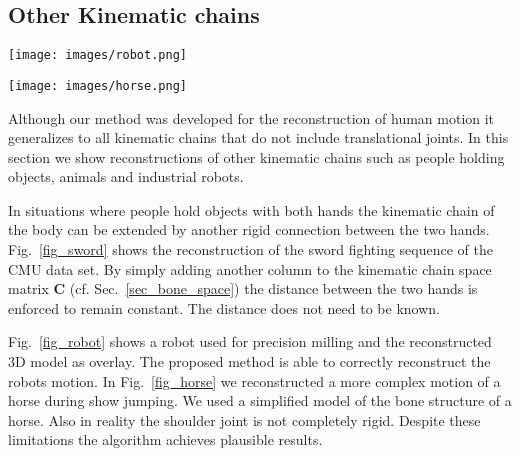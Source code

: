\documentclass[10pt,letterpaper]{article}
\begin{document}
\subsection{Other Kinematic chains}
\label{sec_eval_kin_chains}

\begin{figure*}[t]
	\begin{center}
		\texttt{[image: images/robot.png]}
	\end{center}
	\caption{Reconstruction of a sequence of an industrial robot moving along a path. The reconstruction is shown as an augmented overlay over the images.}
	\label{fig_robot}
\end{figure*}
\begin{figure*}[t]
	\begin{center}
		\texttt{[image: images/horse.png]}
	\end{center}
	\caption{Reconstruction of a horse riding sequence. Although we use a very rough model for the skeleton of the horse we obtain plausible reconstructions.}
	\label{fig_horse}
\end{figure*}

Although our method was developed for the reconstruction of human motion it generalizes to all kinematic chains that do not include translational joints. In this section we show reconstructions of other kinematic chains such as people holding objects, animals and industrial robots.

In situations where people hold objects with both hands the kinematic chain of the body can be extended by another rigid connection between the two hands. Fig.~\ref{fig_sword} shows the reconstruction of the sword fighting sequence of the CMU data set. By simply adding another column to the kinematic chain space matrix $\bm{C}$ (cf. Sec.~\ref{sec_bone_space}) the distance between the two hands is enforced to remain constant. The distance does not need to be known.

Fig.~\ref{fig_robot} shows a robot used for precision milling and the reconstructed 3D model as overlay. The proposed method is able to correctly reconstruct the robots motion. In Fig.~\ref{fig_horse} we reconstructed a more complex motion of a horse during show jumping. We used a simplified model of the bone structure of a horse. Also in reality the shoulder joint is not completely rigid. Despite these limitations the algorithm achieves plausible results.
\end{document}
